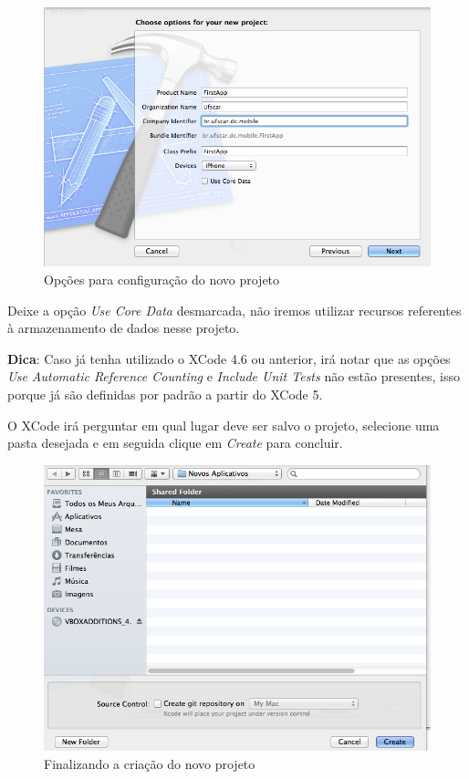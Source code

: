 \documentclass[a4paper,12pt,brazil,oneside]{book}
\begin{document}
\begin{figure}[H]
  \centering
  \includegraphics[width=.75\textwidth]{figuras/3/tela_novo_projeto_2.png}
  \caption{Opções para configuração do novo projeto}
  \label{fig:a}
\end{figure}

Deixe a opção \emph{Use Core Data} desmarcada, não iremos utilizar recursos referentes à armazenamento de dados nesse projeto.

\begin{framed}

\textbf{Dica}: Caso já tenha utilizado o XCode 4.6 ou anterior, irá notar que as opções 
\textit{ Use Automatic Reference Counting } e \textit{ Include Unit Tests } não estão presentes, isso porque já são definidas por padrão a partir do XCode 5.
\end{framed}

O XCode irá perguntar em qual lugar deve ser salvo o projeto, selecione uma pasta desejada e em seguida clique em \emph{Create} para concluir. 

\begin{figure}[H]
  \centering
  \includegraphics[width=.75\textwidth]{figuras/3/tela_novo_projeto_3.png}
  \caption{Finalizando a criação do novo projeto}
  \label{fig:a}
\end{figure}
\end{document}
